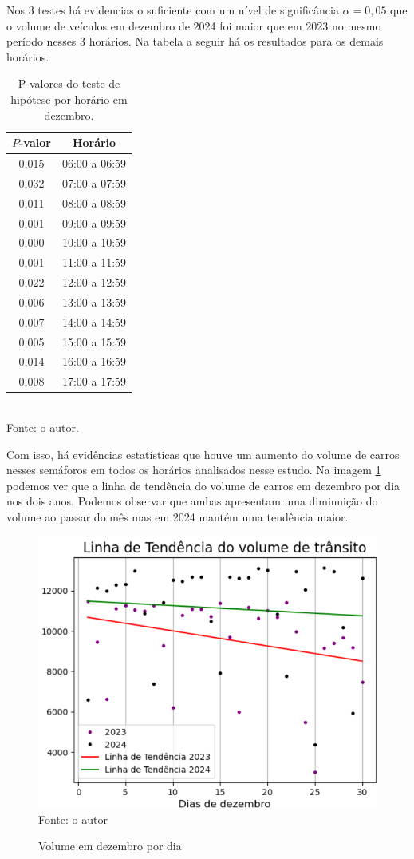 Nos 3 testes há evidencias o suficiente com um nível de significância \(\alpha=0,05\) que o volume de veículos em dezembro de 2024 foi maior que em 2023 no mesmo período nesses 3 horários. Na tabela a seguir há os resultados para os demais horários. 
\begin{table}[H]
\centering
\caption{P-valores do teste de hipótese por horário em dezembro.}
\begin{tabular}{cc}
\hline
\textbf{\(P\)-valor} & \textbf{Horário} \\ \hline
0,015 & 06:00 a 06:59 \\
0,032 & 07:00 a 07:59 \\
0,011 & 08:00 a 08:59 \\
0,001 & 09:00 a 09:59 \\
0,000 & 10:00 a 10:59 \\
0,001 & 11:00 a 11:59 \\
0,022 & 12:00 a 12:59 \\
0,006 & 13:00 a 13:59 \\
0,007 & 14:00 a 14:59 \\
0,005 & 15:00 a 15:59 \\
0,014 & 16:00 a 16:59 \\
0,008 & 17:00 a 17:59 \\ \hline
\end{tabular}
{\footnotesize\\ Fonte: o autor.}
\label{tab:pvalores2}
\end{table}

Com isso, há evidências estatísticas que houve um aumento do volume de carros nesses semáforos em todos os horários analisados nesse estudo. Na imagem \ref{fig:dezembro}  podemos ver que a linha de tendência do volume de carros  em dezembro por dia nos dois anos.  Podemos observar que ambas apresentam uma diminuição do volume ao passar do mês mas em 2024 mantém uma tendência maior.
\begin{figure}[H]
    \centering
    \caption{Volume em dezembro por dia}
    \includegraphics[width=0.7\linewidth]{Imagens/dezembro.png}
    {\footnotesize\\ Fonte: o autor}
    \label{fig:dezembro}
\end{figure}
